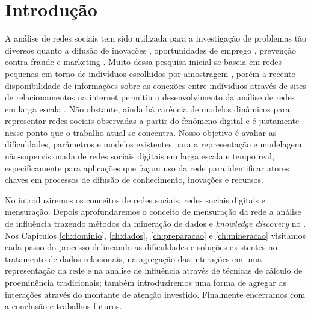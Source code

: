 \chapter{Introdução}
\label{ch:introducao}
A análise de redes sociais tem sido utilizada para a investigação de problemas
tão diversos quanto a difusão de inovações \citep{Coleman1966}, oportunidades de
emprego \citep{Granovetter1995}, prevenção contra fraude \citep{Neville2005} e
marketing \citep{Domingos2001}. Muito dessa pesquisa inicial se baseia em redes
pequenas em torno de indivíduos escolhidos por amostragem
\citep{Wasserman}\citep{Newman2006}, porém a recente disponibilidade de
informações sobre as conexões entre indíviduos através de sites de
relacionamentos na internet permitiu o desenvolvimento da análise de redes em
larga escala \citep{Boyd2007}. Não obstante, ainda há carência de modelos
dinâmicos para representar redes sociais observadas a partir do fenômeno
digital \citep{Xiang2010} e é justamente nesse ponto que o trabalho atual se
concentra. Nosso objetivo é avaliar as dificuldades, parâmetros e modelos
existentes para a representação e modelagem não-supervisionada de redes sociais
digitais em larga escala e tempo real, especificamente para aplicações que façam
uso da rede para identificar atores chaves em processos de difusão de
conhecimento, inovações e recursos.

No  introduziremos os conceitos de redes sociais, redes sociais
digitais e mensuração. Depois aprofundaremos o conceito de mensuração da rede a
análise de influência trazendo métodos da mineração de dados e \emph{knowledge
discovery} no . Nos Capítulos \ref{ch:dominio}, \ref{ch:dados},
\ref{ch:preparacao} e \ref{ch:mineracao} visitamos cada passo do processo
delineando as dificuldades e soluções existentes no tratamento de dados
relacionais, na agregação das interações em uma representação da rede e na
análise de influência através de técnicas de cálculo de proeminência
tradicionais; também introduziremos uma forma de agregar as interações através do
montante de atenção investido. Finalmente encerramos com a conclusão e trabalhos
futuros.